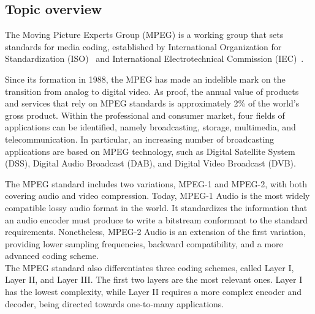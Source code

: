 
\subsection{Topic overview}
The Moving Picture Experts Group (MPEG) is a working group that sets standards for media coding, established by International Organization for Standardization (ISO)~\cite{iso} and International Electrotechnical Commission (IEC)~\cite{iec}.

Since its formation in 1988, the MPEG has made an indelible mark on the transition from analog to digital video. As proof, the annual value of products and services that rely on MPEG standards is approximately 2\% of the world's gross product.
Within the professional and consumer market, four fields of applications can be identified, namely broadcasting, storage, multimedia, and telecommunication. In particular, an increasing number of broadcasting applications are based on MPEG technology, such as Digital Satellite System (DSS), Digital Audio Broadcast (DAB), and Digital Video Broadcast (DVB).

The MPEG standard includes two variations, MPEG-1 and MPEG-2, with both covering audio and video compression.
Today, MPEG-1 Audio is the most widely compatible lossy audio format in the world. It standardizes the information that an audio encoder must produce to write a bitstream conformant to the standard requirements. 
Nonetheless, MPEG-2 Audio is an extension of the first variation, providing lower sampling frequencies, backward compatibility, and a more advanced coding scheme.\\
The MPEG standard also differentiates three coding schemes, called Layer I, Layer II, and Layer III.
The first two layers are the most relevant ones. Layer I has the lowest complexity, while Layer II requires a more complex encoder and decoder, being directed towards one-to-many applications.

